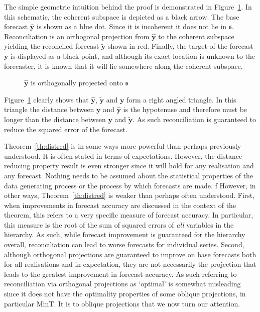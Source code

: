 \documentclass[12pt]{article}
\theoremstyle{definition}
\theoremstyle{property}
\begin{document}
	The simple geometric intuition behind the proof is demonstrated in Figure~\ref{fig:Schematic_OLSRecon}.  In this schematic, the coherent subspace is depicted as a black arrow.  The base forecast $\hat{\bm{y}}$ is shown as a blue dot.  Since it is incoherent it does not lie in $\mathfrak{s}$.  Reconciliation is an orthogonal projection from $\hat{\bm{y}}$ to the coherent subspace yielding the reconciled forecast $\tilde{\bm{y}}$ shown in red.  Finally, the target of the forecast $\bm{y}$ is displayed as a black point, and although its exact location is unknown to the forecaster, it is known that it will lie somewhere along the coherent subspace.
	
	\begin{figure}[H]
		\centering
		\vspace{-0.9cm}
		\tiny
		\resizebox{\linewidth}{!}{}
		\label{fig:Schematic_OLSRecon}
		\caption{$\hat{\bm{y}}$ is orthogonally projected onto $\mathfrak{s}$}
		
	\end{figure}
	
	
	Figure~\ref{fig:Schematic_OLSRecon} clearly shows that $\hat{\bm{y}}$, $\tilde{\bm{y}}$ and $\bm{y}$ form a right angled triangle.  In this triangle the distance between $\bm{y}$ and $\hat{\bm{y}}$ is the hypotenuse and therefore must be longer than the distance between $\bm{y}$ and $\tilde{\bm{y}}$.  As such reconciliation is guaranteed to reduce the squared error of the forecast.  
	
    Theorem~\ref{th:distred} is in some ways more powerful than perhaps previously understood.  It is often stated in terms of expectations.  However, the distance reducing property result is even stronger since it will hold for any realisation and any forecast.  Nothing needs to be assumed about the statistical properties of the data generating process or the process by which forecasts are made.  
    f
    However, in other ways, Theorem~\ref{th:distred} is weaker than perhaps often understood. First, when improvements in forecast accuracy are discussed in the context of the theorem, this refers to a very specific measure of forecast accuracy.  In particular, this measure is the root of the sum of squared errors of {\em all} variables in the hierarchy.  As such, while forecast improvement is guaranteed for the hierarchy overall, reconciliation can lead to worse forecasts for individual series. Second, although orthogonal projections are guaranteed to improve on base forecasts both for all realisations and in expectation, they are not necessarily the projection that leads to the greatest improvement in forecast accuracy.  As such referring to reconciliation via orthogonal projections as `optimal' is somewhat misleading since it does not have the optimality properties of some oblique projections, in particular MinT. It is to oblique projections that we now turn our attention.
    	
\end{document}
